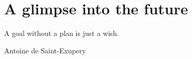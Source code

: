 \documentclass[12pt,letterpaper]{book}
\theoremstyle{definition} \newtheorem{definition}{Definición}[section]
\theoremstyle{plain} \newtheorem{theorem}{Teorema}[section]
\theoremstyle{plain} \newtheorem{lemma}{Lema}[section]
\theoremstyle{plain} \newtheorem{proposition}[theorem]{Proposici\'on}
\theoremstyle{plain} \newtheorem{corollary}[theorem]{Corolario}
\theoremstyle{plain} \newtheorem{remark}[theorem]{Comentario}
\begin{document}
\chapter{A glimpse into the future}
\epigraph{A goal without a plan is just a wish.}{Antoine de Saint-Exupery}


\iffalse

\backmatter
\appendix
\chapter{Appendix A}

\chapter{Appendix B}

\chapter{Appendix C}


\fi

\cleardoublepage
{}


\cleardoublepage
\printindex
\end{document}
